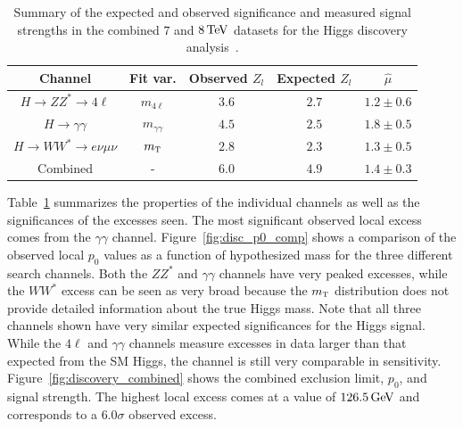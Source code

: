 \begin{table}[h!]
\centering
\captionsetup{justification=centering}

\hspace{-10pt}
\begin{tabular}{|c|c|c|c|c|}
\hline
Channel & Fit var. & Observed $Z_l$ & Expected $Z_l$ & $\hat{\mu}$ \\ \hline
$H\to ZZ^* \to 4\ell$ & $m_{4\ell}$ & $3.6$ & $2.7$ & $1.2 \pm 0.6$ \\ \hline
$H\to\gamma\gamma$ & $m_{\gamma\gamma}$ & $4.5$ & $2.5$ & $1.8 \pm 0.5$ \\ \hline
$H\to WW^* \to e\nu\mu\nu$ & $m_{\textrm{\footnotesize\sc t}}$ & $2.8$ & $2.3$ & $1.3 \pm 0.5$ \\ \hline
Combined & - & $6.0$ & $4.9$ & $1.4 \pm 0.3$ \\ \hline
\end{tabular}

\caption{
Summary of the expected and observed significance and measured signal strengths in the combined $7$ and $8 \TeV$ datasets for the Higgs discovery analysis~\cite{Discovery}. 
}
\label{tab:discovery_summary}
\end{table}

Table~\ref{tab:discovery_summary} summarizes the properties of the individual channels as well as the significances of the excesses seen. The most significant observed local excess comes from the $\gamma\gamma$ channel. Figure~\ref{fig:disc_p0_comp} shows a comparison of the observed local $p_0$ values as a function of hypothesized mass for the three different search channels. Both the $ZZ^*$ and $\gamma\gamma$ channels have very peaked excesses, while the $WW^*$ excess can be seen as very broad because the $m_{\textrm{\footnotesize\sc t}}$ distribution does not provide detailed information about the true Higgs mass. Note that all three channels shown have very similar expected significances for the Higgs signal. While the $4\ell$ and $\gamma\gamma$ channels measure excesses in data larger than that expected from the SM Higgs, the \HWWfull channel is still very comparable in sensitivity. Figure~\ref{fig:discovery_combined} shows the combined exclusion limit, $p_0$, and signal strength. The highest local excess comes at a value of $126.5 \GeV$ and corresponds to a $6.0\sigma$ observed excess. 

